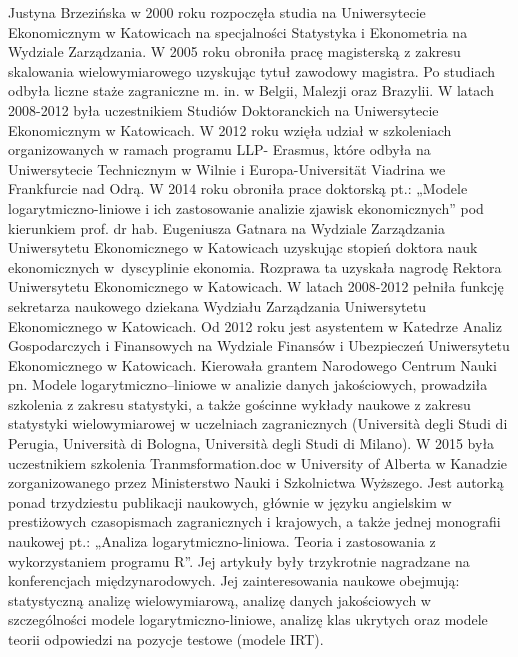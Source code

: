 \documentclass[\main/boa.tex]{subfiles}
\begin{document}
Justyna Brzezińska w 2000 roku rozpoczęła studia na Uniwersytecie Ekonomicznym w Katowicach na specjalności Statystyka i Ekonometria na Wydziale Zarządzania. W 2005 roku obroniła pracę magisterską z zakresu skalowania wielowymiarowego uzyskując tytuł zawodowy magistra. Po studiach odbyła liczne staże zagraniczne m. in. w Belgii, Malezji oraz Brazylii. W latach 2008-2012 była uczestnikiem Studiów Doktoranckich na Uniwersytecie Ekonomicznym w Katowicach. W 2012 roku wzięła udział w szkoleniach organizowanych w ramach programu LLP- Erasmus, które odbyła na Uniwersytecie Technicznym w Wilnie i Europa-Universität Viadrina we Frankfurcie nad Odrą. W 2014 roku obroniła prace doktorską pt.: „Modele logarytmiczno-liniowe i ich zastosowanie analizie zjawisk ekonomicznych” pod kierunkiem prof. dr hab. Eugeniusza Gatnara na Wydziale Zarządzania Uniwersytetu Ekonomicznego w Katowicach uzyskując stopień doktora nauk ekonomicznych w~dyscyplinie ekonomia. Rozprawa ta uzyskała nagrodę Rektora Uniwersytetu Ekonomicznego w Katowicach. W latach 2008-2012 pełniła funkcję sekretarza naukowego dziekana Wydziału Zarządzania Uniwersytetu Ekonomicznego w Katowicach. Od 2012 roku jest asystentem w Katedrze Analiz Gospodarczych i Finansowych na Wydziale Finansów i Ubezpieczeń Uniwersytetu \break Ekonomicznego w Katowicach. Kierowała grantem Narodowego Centrum Nauki pn. Modele logarytmiczno–liniowe w analizie danych jakościowych, prowadziła szkolenia z zakresu statystyki, a także gościnne wykłady naukowe z zakresu statystyki wielowymiarowej w uczelniach zagranicznych (Università degli Studi di Perugia, Università di Bologna, Università degli Studi di Milano). W 2015 była uczestnikiem szkolenia Tranmsformation.doc w University of Alberta w Kanadzie zorganizowanego przez Ministerstwo Nauki i Szkolnictwa Wyższego. Jest autorką ponad trzydziestu publikacji naukowych, głównie w języku angielskim w presti\-żowych czasopismach zagranicznych i krajowych, a także jednej monografii naukowej pt.: „Analiza logarytmiczno-liniowa. Teoria i zastosowania z wykorzystaniem programu R”. Jej artykuły były trzykrotnie nagradzane na konferencjach międzynarodowych. Jej zainteresowania naukowe obejmują: statystyczną analizę wielowymiarową, analizę danych jakościowych w szczególności modele logarytmiczno-liniowe, analizę klas ukrytych oraz modele teorii odpowiedzi na pozycje testowe (modele IRT).
\end{document}
